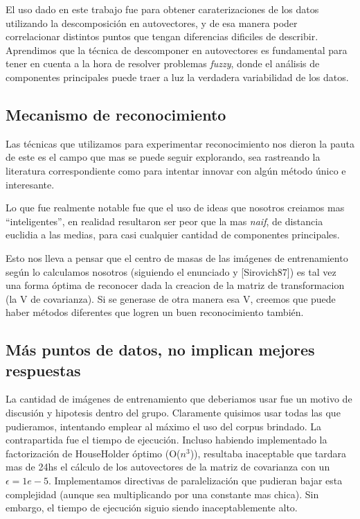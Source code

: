 El uso dado en este trabajo fue para obtener caraterizaciones de los datos utilizando la 
descomposici\'on en autovectores, y de esa manera poder correlacionar distintos puntos que
tengan diferencias dificiles de describir. Aprendimos que la t\'ecnica de descomponer en autovectores 
es fundamental para tener en cuenta a la hora de resolver problemas \textit{fuzzy}, donde
el an\'alisis de componentes principales puede traer a luz la verdadera variabilidad de los datos.


\subsection{Mecanismo de reconocimiento}

Las t\'ecnicas que utilizamos para experimentar reconocimiento nos dieron
la pauta de  este es el campo que mas se puede seguir explorando, sea rastreando la literatura
correspondiente como para intentar innovar con alg\'un m\'etodo \'unico e interesante. 

Lo que fue realmente notable fue que el uso de ideas que nosotros creiamos mas ``inteligentes'',
en realidad resultaron ser peor que la mas \textit{naif}, de distancia euclidia a las medias, para
casi cualquier cantidad de componentes principales.

Esto nos lleva a pensar que el centro de masas de las im\'agenes de entrenamiento seg\'un lo calculamos
nosotros (siguiendo el enunciado y [Sirovich87]) es tal vez una forma \'optima de reconocer
dada la creacion de la matriz de transformacion (la V de covarianza). Si se generase de otra manera esa
V, creemos que puede haber m\'etodos diferentes que logren un buen reconocimiento tambi\'en.


\subsection{M\'as puntos de datos, no implican mejores respuestas}

La cantidad de im\'agenes de entrenamiento que deberiamos usar fue un motivo de discusi\'on y hipotesis
dentro del grupo. Claramente quisimos usar todas las que pudieramos, intentando emplear al m\'aximo el 
uso del corpus brindado. La contrapartida fue el tiempo de ejecuci\'on. Incluso habiendo implementado
la factorizaci\'on de HouseHolder \'optimo (O($n^3$)), resultaba inaceptable que tardara mas de 24hs
el c\'alculo de los autovectores de la matriz de covarianza con un $\epsilon = 1e-5$. Implementamos 
directivas de paralelizaci\'on que pudieran bajar esta complejidad (aunque sea multiplicando por una 
constante mas chica). Sin embargo, el tiempo de ejecuci\'on siguio siendo inaceptablemente alto.

